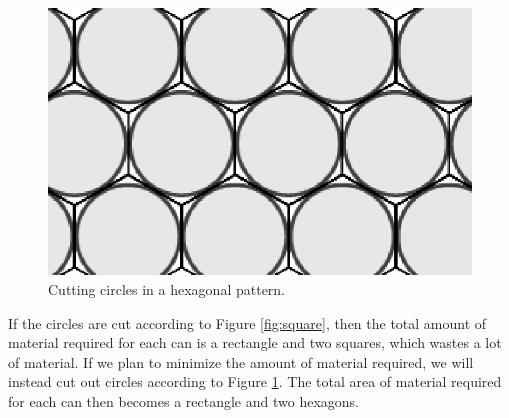 \begin{figure}[h]
\centering
\includegraphics[scale=0.5]{activities/math112/figures/hexagons.eps}
\caption{Cutting circles in a hexagonal pattern.}
\label{fig:hexagon}
\end{figure}
    
If the circles are cut according to Figure \ref{fig:square}, then the total amount of material required for each can is a rectangle and two squares, which wastes a lot of material. If we plan to minimize the amount of material required, we will instead cut out circles according to Figure \ref{fig:hexagon}. The total area of material required for each can then becomes a rectangle and two hexagons.

